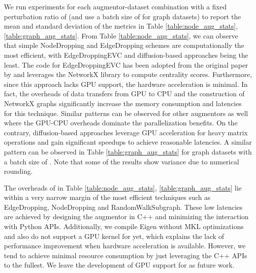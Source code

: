 \documentclass{article}
\theoremstyle{plain}
\theoremstyle{definition}
\theoremstyle{remark}
\begin{document}
We run  experiments for each augmentor-dataset combination with a fixed perturbation ratio of  (and use a batch size of  for graph datasets) to report the mean and standard deviation of the metrics in Table \ref{table:node_aug_stats}, \ref{table:graph_aug_stats}. From Table \ref{table:node_aug_stats}, we can observe that simple NodeDropping and EdgeDropping schemes are computationally the most efficient, with EdgeDroppingEVC and diffusion-based approaches being the least. The code for EdgeDroppingEVC has been adopted from the original paper by \citet{zhu2021graph} and leverages the NetworkX library to compute centrality scores. Furthermore, since this approach lacks GPU support, the hardware acceleration is minimal. In fact, the overheads of data transfers from GPU to CPU and the construction of NetworkX graphs significantly increase the memory consumption and latencies for this technique. Similar patterns can be observed for other augmentors as well where the GPU-CPU overheads dominate the parallelization benefits. On the contrary, diffusion-based approaches leverage GPU acceleration for heavy matrix operations and gain significant speedups to achieve reasonable latencies. A similar pattern can be observed in Table \ref{table:graph_aug_stats} for graph datasets with a batch size of . Note that some of the results show  variance due to numerical rounding.

The overheads of  in Table \ref{table:node_aug_stats}, \ref{table:graph_aug_stats} lie within a very narrow margin of the most efficient techniques such as EdgeDropping, NodeDropping and RandomWalkSubgraph. These low latencies are achieved by designing the augmentor in C++ and minimizing the interaction with Python APIs. Additionally, we compile Eigen without MKL optimizations and also do not support a GPU kernel for  yet, which explains the lack of performance improvement when hardware acceleration is available. However, we tend to achieve minimal resource consumption by just leveraging the C++ APIs to the fullest. We leave the development of GPU support for  as future work.
\end{document}
